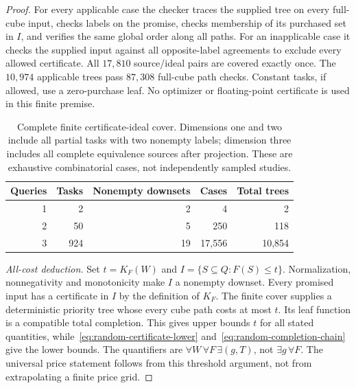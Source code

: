 \begin{proof}
For every applicable case the checker traces the supplied tree on every full-cube input, checks labels on the promise, checks membership of its purchased set in $I$, and verifies the same global order along all paths. For an inapplicable case it checks the supplied input against all opposite-label agreements to exclude every allowed certificate. All $17{,}810$ source/ideal pairs are covered exactly once. The $10{,}974$ applicable trees pass $87{,}308$ full-cube path checks. Constant tasks, if allowed, use a zero-purchase leaf. No optimizer or floating-point certificate is used in this finite premise.

\begin{table}[ht]
\centering\small
\begin{tabular}{@{}rrrrr@{}}\toprule
Queries & Tasks & Nonempty downsets & Cases & Total trees\\\midrule
1 & 2 & 2 & 4 & 2\\
2 & 50 & 5 & 250 & 118\\
3 & 924 & 19 & 17,556 & 10,854\\\bottomrule
\end{tabular}
\caption{Complete finite certificate-ideal cover. Dimensions one and two include all partial tasks with two nonempty labels; dimension three includes all complete equivalence sources after projection. These are exhaustive combinatorial cases, not independently sampled studies.}\label{tab:small-ideal}
\end{table}

\emph{All-cost deduction.} Set $t=K_F(W)$ and $I=\{S\subseteq Q:F(S)\leq t\}$. Normalization, nonnegativity and monotonicity make $I$ a nonempty downset. Every promised input has a certificate in $I$ by the definition of $K_F$. The finite cover supplies a deterministic priority tree whose every cube path costs at most $t$. Its leaf function is a compatible total completion. This gives upper bounds $t$ for all stated quantities, while~\eqref{eq:random-certificate-lower} and~\eqref{eq:random-completion-chain} give the lower bounds. The quantifiers are $\forall W\,\forall F\,\exists(g,T)$, not $\exists g\,\forall F$. The universal price statement follows from this threshold argument, not from extrapolating a finite price grid.
\end{proof}

